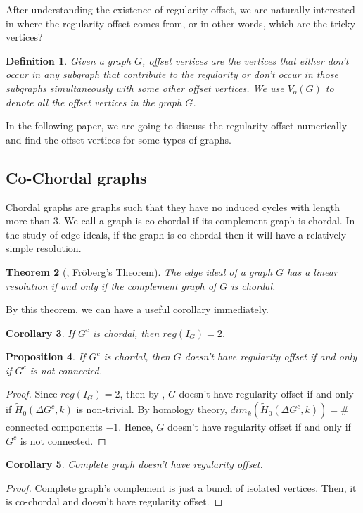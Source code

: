 \documentclass[dvipsnames,10pt]{article}
\newtheorem{theorem}{Theorem}[section]
\newtheorem{proposition}[theorem]{Proposition}
\newtheorem{cor}[theorem]{Corollary}
\newtheorem{defi}[theorem]{Definition}
\begin{document}
After understanding the existence of regularity offset, we are naturally interested in where the regularity offset comes from, or in other words, which are the tricky vertices? 

\begin{defi}
    Given a graph $G$, offset vertices are the vertices that either don't occur in any subgraph that contribute to the regularity or don't occur in those subgraphs simultaneously with some other offset vertices. We use $V_o(G)$ to denote all the offset vertices in the graph $G$.
\end{defi}

In the following paper, we are going to discuss the regularity offset numerically and find the offset vertices for some types of graphs.

\subsection{Co-Chordal graphs}
Chordal graphs are graphs such that they have no induced cycles with length more than $3$. We call a graph is co-chordal if its complement graph is chordal. In the study of edge ideals, if the graph is co-chordal then it will have a relatively simple resolution.
\begin{theorem}[\cite{RalfFröberg1990}, Fröberg’s Theorem]
    The edge ideal of a graph $G$ has a linear resolution if and only if the complement graph of $G$ is chordal.
\end{theorem}
By this theorem, we can have a useful corollary immediately.
\begin{cor}
    If $G^c$ is chordal, then $reg(I_G)=2$.
\end{cor}

\begin{proposition}
    If $G^c$ is chordal, then $G$ doesn't have regularity offset if and only if $G^c$ is not connected.
\end{proposition}

\begin{proof}
    Since $reg(I_G)=2$, then by , $G$ doesn't have regularity offset if and only if $\widetilde{H}_{0}\left(\Delta G^c, k\right)$ is non-trivial. By homology theory, $dim_k(\widetilde{H}_{0}\left(\Delta G^c, k\right))=\#$ connected components $-1$. Hence, $G$ doesn't have regularity offset if and only if $G^c$ is not connected.
\end{proof}

\begin{cor}
    Complete graph doesn't have regularity offset.
\end{cor}
\begin{proof}
    Complete graph's complement is just a bunch of isolated vertices. Then, it is co-chordal and doesn't have regularity offset. 
\end{proof}
\end{document}
